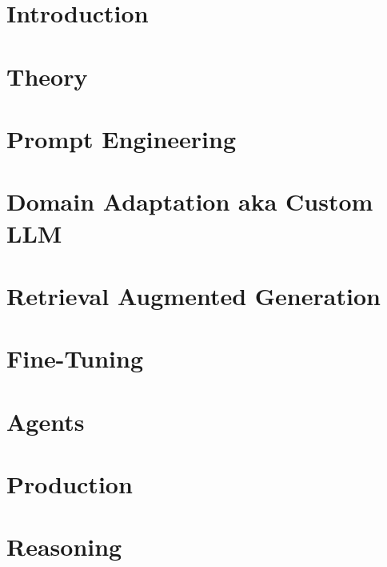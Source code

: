 \section[Intro]{Introduction}


\section[Theory]{Theory}








\section[Prompts]{Prompt Engineering}




\section[DA]{Domain Adaptation aka Custom LLM}



\section[RAG]{Retrieval Augmented Generation}



\section[FT]{Fine-Tuning}


\section[Agents]{Agents}


\section[Prod]{Production}




\section[LRM]{Reasoning}


